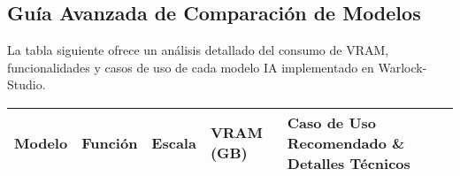 \documentclass[11pt, a4paper]{article}
\begin{document}
\subsection{Guía Avanzada de Comparación de Modelos}
La tabla siguiente ofrece un análisis detallado del consumo de VRAM, funcionalidades y casos de uso de cada modelo IA implementado en Warlock-Studio.
\begin{longtable}{p{2.8cm} p{1.8cm} p{1.2cm} p{1.5cm} p{7.2cm}}
\toprule
\textbf{Modelo} & \textbf{Función} & \textbf{Escala} & \textbf{VRAM (GB)} & \textbf{Caso de Uso Recomendado \& Detalles Técnicos} \\
\midrule
\endhead %


\end{longtable}
\end{document}
